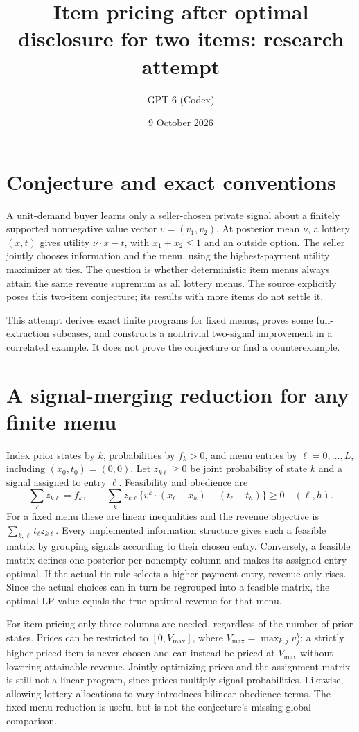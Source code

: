 \documentclass[11pt]{article}
\title{Item pricing after optimal disclosure for two items: research attempt}
\author{GPT-6 (Codex)}
\date{9 October 2026}
\begin{document}
\maketitle

\section*{Conjecture and exact conventions}
A unit-demand buyer learns only a seller-chosen private signal about a finitely supported nonnegative value vector $v=(v_1,v_2)$. At posterior mean $\nu$, a lottery $(x,t)$ gives utility $\nu\cdot x-t$, with $x_1+x_2\leq1$ and an outside option. The seller jointly chooses information and the menu, using the highest-payment utility maximizer at ties. The question is whether deterministic item menus always attain the same revenue supremum as all lottery menus. The source explicitly poses this two-item conjecture; its results with more items do not settle it.

This attempt derives exact finite programs for fixed menus, proves some full-extraction subcases, and constructs a nontrivial two-signal improvement in a correlated example. It does not prove the conjecture or find a counterexample.

\section*{A signal-merging reduction for any finite menu}
Index prior states by $k$, probabilities by $f_k>0$, and menu entries by $\ell=0,\ldots,L$, including $(x_0,t_0)=(0,0)$. Let $z_{k\ell}\geq0$ be joint probability of state $k$ and a signal assigned to entry $\ell$. Feasibility and obedience are
\[
 \sum_\ell z_{k\ell}=f_k,
 \qquad
 \sum_kz_{k\ell}\{v^k\cdot(x_\ell-x_h)-(t_\ell-t_h)\}\geq0
 \quad(\ell,h).
\]
For a fixed menu these are linear inequalities and the revenue objective is
$\sum_{k,\ell}t_\ell z_{k\ell}$. Every implemented information structure gives such a feasible matrix by grouping signals according to their chosen entry. Conversely, a feasible matrix defines one posterior per nonempty column and makes its assigned entry optimal. If the actual tie rule selects a higher-payment entry, revenue only rises. Since the actual choices can in turn be regrouped into a feasible matrix, the optimal LP value equals the true optimal revenue for that menu.

For item pricing only three columns are needed, regardless of the number of prior states. Prices can be restricted to $[0,V_{\max}]$, where $V_{\max}=\max_{k,j}v^k_j$: a strictly higher-priced item is never chosen and can instead be priced at $V_{\max}$ without lowering attainable revenue. Jointly optimizing prices and the assignment matrix is still not a linear program, since prices multiply signal probabilities. Likewise, allowing lottery allocations to vary introduces bilinear obedience terms. The fixed-menu reduction is useful but is not the conjecture's missing global comparison.
\end{document}

